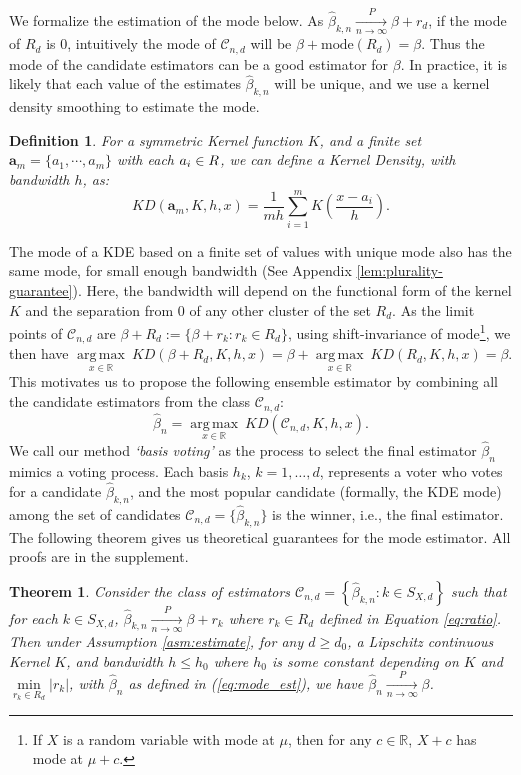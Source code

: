 \documentclass[
  12pt]{article}
\DeclareMathOperator*{\argmax}{arg\,max}
\newcommand{\pnlim}{\xrightarrow[n \to \infty]{P}}
\newcommand{\calC}{\mathcal{C}}
\newcommand{\R}{\mathbb{R}}
\newcommand{\ba}{\boldsymbol{a}}
\newtheorem{theorem}{Theorem}
\newtheorem{definition}{Definition}
\begin{document}
We formalize the estimation of the mode below. As $\hat \beta_{k,n} \pnlim \beta + r_{d}$, if the mode of $R_d$ is $0$, intuitively the mode of $\calC_{n,d}$ will be $\beta + \text{mode}(R_d) = \beta$. Thus the mode of the candidate estimators can be a good estimator for $\beta$. 
In practice, it is likely that each value of the estimates $\hat \beta_{k,n}$ will be unique, and we use a kernel density smoothing to estimate the mode. 
\begin{definition}\label{def:kde}
    \textit{For a symmetric Kernel function $K$, and a finite set $\ba_m = \{a_1, \cdots, a_m\}$ with each $ a_i\in \mathbb \R$, we can define a Kernel Density, with bandwidth $h$, as:
    $$
    KD(\ba_m,K,h,x) = \dfrac{1}{mh}\sum_{i=1}^m K\left(\dfrac{x - a_i}{h}\right). 
    $$}
\end{definition}
The mode of a KDE based on a finite set of values with unique mode also has the same mode, for small enough bandwidth (See Appendix \ref{lem:plurality-guarantee}). %
Here, the bandwidth will depend on the functional form of the kernel $K$ and the separation from $0$ of any other cluster of the set $R_d$. As the limit points of $\calC_{n,d}$ are $\beta + R_d:= \{\beta + r_k : r_k \in R_d\}$, using shift-invariance of mode\footnote{If $X$ is a random variable with mode at $\mu$, then for any $c \in \mathbb R$, $X+c$ has mode at $\mu+c$.}, we then have  
$\underset{x\in\R}{\argmax} \ KD(\beta + R_{d},K,h,x) = \beta + \underset{x\in \R}{\argmax} \ KD(R_{d},K,h,x) = \beta$. 
This motivates us to propose the following ensemble estimator by combining all the candidate estimators from the class $\calC_{n,d}$: 
\begin{equation}\label{eq:mode_est}
    \hat{\beta}_n = 
    \underset{x\in\R}{\argmax} 
    \ KD(\calC_{n,d},K,h,x).
\end{equation}
We call our method {\em `basis voting'} as the process to select the final estimator $\hat \beta_n$ mimics a voting process. Each basis $h_k$, $k=1,\ldots,d$, represents a voter who votes for a candidate $\hat \beta_{k,n}$, and the most popular candidate (formally, the KDE mode) among the set of candidates $\calC_{n,d} = \{\hat \beta_{k,n}\}$ is the winner, i.e., the final estimator. 
The following theorem gives us theoretical guarantees for the mode estimator. All proofs are in the supplement.
\begin{theorem}\label{thm:mode-consistent}
    Consider the class of estimators $\calC_{n,d} = \left\{\hat{\beta}_{k,n}: k \in S_{X,d}\right\}$ such that for each $k \in S_{X,d}$, $\hat{\beta}_{k,n} \pnlim \beta + r_k$ where $r_k \in R_d$ defined in Equation \ref{eq:ratio}. Then under Assumption \ref{asm:estimate}, for any $d \geq d_0$, a Lipschitz continuous Kernel $K$, and bandwidth $h \leq h_0$ where $h_0$ is some constant depending on $K$ and $\underset{r_k \in R_{d}}{\min} \left|r_k\right|$, 
    with $
    \hat{\beta}_n$ as defined in (\ref{eq:mode_est}), we have  
    $\hat \beta_n \pnlim \beta 
    $.
\end{theorem}
\end{document}
